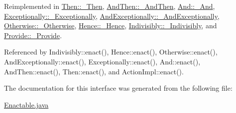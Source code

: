 Reimplemented in \hyperlink{classThen_1_1__Then_a0}{Then::\_\-Then}, \hyperlink{classAndThen_1_1__AndThen_a0}{And\-Then::\_\-And\-Then}, \hyperlink{classAnd_1_1__And_a0}{And::\_\-And}, \hyperlink{classExceptionally_1_1__Exceptionally_a0}{Exceptionally::\_\-Exceptionally}, \hyperlink{classAndExceptionally_1_1__AndExceptionally_a0}{And\-Exceptionally::\_\-And\-Exceptionally}, \hyperlink{classOtherwise_1_1__Otherwise_a0}{Otherwise::\_\-Otherwise}, \hyperlink{classHence_1_1__Hence_a0}{Hence::\_\-Hence}, \hyperlink{classIndivisibly_1_1__Indivisibly_a0}{Indivisibly::\_\-Indivisibly}, and \hyperlink{classProvide_1_1__Provide_a0}{Provide::\_\-Provide}.

Referenced by Indivisibly::enact(), Hence::enact(), Otherwise::enact(), And\-Exceptionally::enact(), Exceptionally::enact(), And::enact(), And\-Then::enact(), Then::enact(), and Action\-Impl::enact().



The documentation for this interface was generated from the following file:\begin{CompactItemize}
\item 
\hyperlink{Enactable_8java-source}{Enactable.java}\end{CompactItemize}
